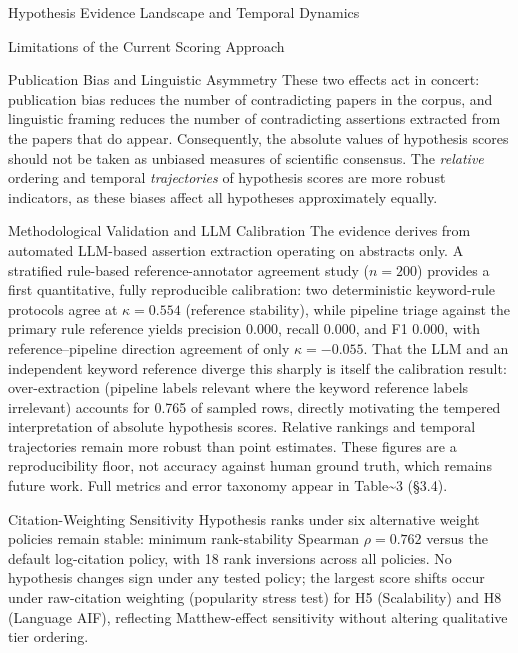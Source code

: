 \documentclass[
  ignorenonframetext,
]{beamer}
\begin{document}
\begin{frame}{Hypothesis Evidence Landscape
and Temporal Dynamics \label{sec:hypothesis_results}}
\begin{block}{Limitations of the Current Scoring Approach}
\begin{block}{Publication Bias and Linguistic Asymmetry
\label{sec:pub_bias}}
These two effects act in concert: publication bias reduces the number of
contradicting papers in the corpus, and linguistic framing reduces the
number of contradicting assertions extracted from the papers that do
appear. Consequently, the absolute values of hypothesis scores should
not be taken as unbiased measures of scientific consensus. The
\textit{relative} ordering and temporal \textit{trajectories} of
hypothesis scores are more robust indicators, as these biases affect all
hypotheses approximately equally.
\end{block}
\end{block}

\begin{block}{Methodological Validation and LLM Calibration}
\protect{}\label{methodological-validation-and-llm-calibration}
The evidence derives from automated LLM-based assertion extraction
operating on abstracts only. A stratified rule-based reference-annotator
agreement study (\(n = 200\)) provides a first quantitative, fully
reproducible calibration: two deterministic keyword-rule protocols agree
at \(\kappa = 0.554\) (reference stability), while pipeline triage
against the primary rule reference yields precision 0.000, recall 0.000,
and F1 0.000, with reference--pipeline direction agreement of only
\(\kappa = -0.055\). That the LLM and an independent keyword reference
diverge this sharply is itself the calibration result: over-extraction
(pipeline labels relevant where the keyword reference labels irrelevant)
accounts for 0.765 of sampled rows, directly motivating the tempered
interpretation of absolute hypothesis scores. Relative rankings and
temporal trajectories remain more robust than point estimates. These
figures are a reproducibility floor, not accuracy against human ground
truth, which remains future work. Full metrics and error taxonomy appear
in Table\textasciitilde{}3
(\S3.4).
\end{block}

\begin{block}{Citation-Weighting Sensitivity}
\protect{}\label{citation-weighting-sensitivity}
Hypothesis ranks under six alternative weight policies remain stable:
minimum rank-stability Spearman \(\rho = 0.762\) versus the default
log-citation policy, with 18 rank inversions across all policies. No
hypothesis changes sign under any tested policy; the largest score
shifts occur under raw-citation weighting (popularity stress test) for
H5 (Scalability) and H8 (Language AIF), reflecting Matthew-effect
sensitivity without altering qualitative tier ordering.
\end{block}
\end{frame}
\end{document}
